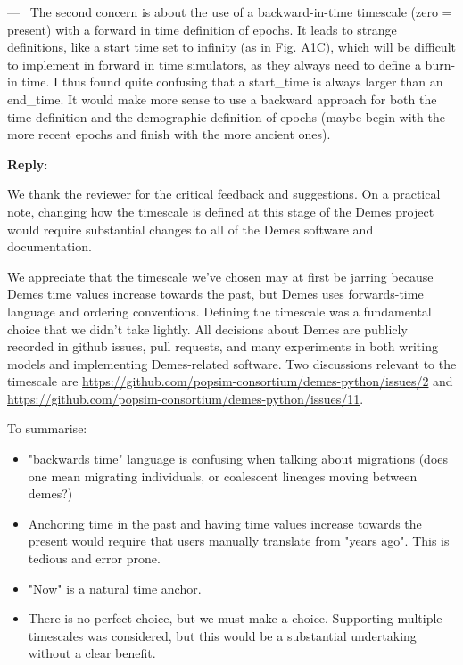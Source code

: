 \documentclass[11pt]{article}
\newcounter{reviewer}
\newcounter{point}[reviewer]
\renewcommand{\thepoint}{\thereviewer.\arabic{point}}
\newenvironment{point}
   {\refstepcounter{point} \bigskip \noindent {\textbf{Reviewer~Point~\thepoint} } ---\ }
   {\par }
\newenvironment{reply}
   {\medskip \noindent \begin{sf}\textbf{Reply}:\  }
   {\medskip \end{sf}}
\begin{document}
\begin{point}
The second concern is about the use of a backward-in-time timescale (zero =
present) with a forward in time definition of epochs. It leads to strange
definitions, like a start time set to infinity (as in Fig. A1C), which will be
difficult to implement in forward in time simulators, as they always need to
define a burn-in time. I thus found quite confusing that a start\_time is always
larger than an end\_time. It would make more sense to use a backward approach
for both the time definition and the demographic definition of epochs (maybe
begin with the more recent epochs and finish with the more ancient ones).
\end{point}
\begin{reply}

We thank the reviewer for the critical feedback and suggestions.
On a practical note, changing how the timescale is defined
at this stage of the Demes project would require substantial changes
to all of the Demes software and documentation.

We appreciate that the timescale we've chosen may at first be jarring
because Demes time values increase towards the past, but Demes uses
forwards-time language and ordering conventions.
Defining the timescale was a fundamental choice that we didn't take lightly.
All decisions about Demes are publicly recorded in github issues,
pull requests, and many experiments in both writing models and implementing
Demes-related software.
Two discussions relevant to the timescale are
\url{https://github.com/popsim-consortium/demes-python/issues/2}
and
\url{https://github.com/popsim-consortium/demes-python/issues/11}.

To summarise:
\begin{itemize}
\item
"backwards time" language is confusing when talking about migrations
(does one mean migrating individuals, or coalescent lineages moving
between demes?)
\item
Anchoring time in the past and having time values increase towards
the present would require that users manually translate from "years ago".
This is tedious and error prone.
\item
"Now" is a natural time anchor.
\item
There is no perfect choice, but we must make a choice.
Supporting multiple timescales was considered, but this would be a
substantial undertaking without a clear benefit.
\end{itemize}


\end{reply}
\end{document}

